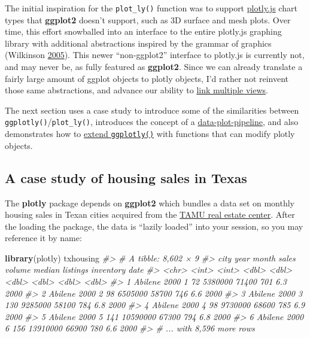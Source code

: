 \documentclass[12pt,]{isuthesis}
\newenvironment{Shaded}{\begin{snugshade}}{\end{snugshade}}
\newcommand{\KeywordTok}[1]{\textcolor[rgb]{0.13,0.29,0.53}{\textbf{{#1}}}}
\newcommand{\CommentTok}[1]{\textcolor[rgb]{0.56,0.35,0.01}{\textit{{#1}}}}
\newcommand{\NormalTok}[1]{{#1}}
\begin{document}
The initial inspiration for the \texttt{plot\_ly()} function was to
support \href{https://github.com/plotly/plotly.js}{plotly.js} chart
types that \textbf{ggplot2} doesn't support, such as 3D surface and mesh
plots. Over time, this effort snowballed into an interface to the entire
plotly.js graphing library with additional abstractions inspired by the
grammar of graphics (Wilkinson
\protect\hyperlink{ref-Wilkinson:2005}{2005}). This newer
``non-ggplot2'' interface to plotly.js is currently not, and may never
be, as fully featured as \textbf{ggplot2}. Since we can already
translate a fairly large amount of ggplot objects to plotly objects, I'd
rather not reinvent those same abstractions, and advance our ability to
\protect\hyperlink{multiple-linked-views}{link multiple views}.

The next section uses a case study to introduce some of the similarities
between \texttt{ggplotly()}/\texttt{plot\_ly()}, introduces the concept
of a \protect\hyperlink{the-data-plot-pipeline}{data-plot-pipeline}, and
also demonstrates how to \protect\hyperlink{extending-ggplotly}{extend
\texttt{ggplotly()}} with functions that can modify plotly objects.

\subsection{A case study of housing sales in
Texas}\label{a-case-study-of-housing-sales-in-texas}

The \textbf{plotly} package depends on \textbf{ggplot2} which bundles a
data set on monthly housing sales in Texan cities acquired from the
\href{http://recenter.tamu.edu/}{TAMU real estate center}. After the
loading the package, the data is ``lazily loaded'' into your session, so
you may reference it by name:

\begin{Shaded}
\begin{Highlighting}[]
\KeywordTok{library}\NormalTok{(plotly)}
\NormalTok{txhousing}
\CommentTok{#> # A tibble: 8,602 × 9}
\CommentTok{#>      city  year month sales   volume median listings inventory  date}
\CommentTok{#>     <chr> <int> <int> <dbl>    <dbl>  <dbl>    <dbl>     <dbl> <dbl>}
\CommentTok{#> 1 Abilene  2000     1    72  5380000  71400      701       6.3  2000}
\CommentTok{#> 2 Abilene  2000     2    98  6505000  58700      746       6.6  2000}
\CommentTok{#> 3 Abilene  2000     3   130  9285000  58100      784       6.8  2000}
\CommentTok{#> 4 Abilene  2000     4    98  9730000  68600      785       6.9  2000}
\CommentTok{#> 5 Abilene  2000     5   141 10590000  67300      794       6.8  2000}
\CommentTok{#> 6 Abilene  2000     6   156 13910000  66900      780       6.6  2000}
\CommentTok{#> # ... with 8,596 more rows}
\end{Highlighting}
\end{Shaded}
\end{document}
